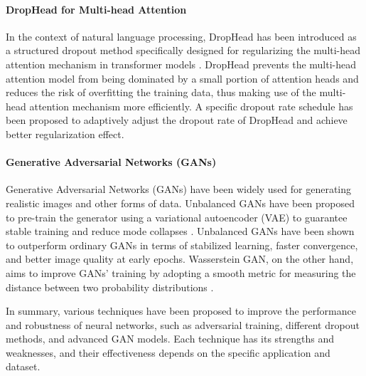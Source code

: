\paragraph{DropHead for Multi-head Attention}
In the context of natural language processing, DropHead has been introduced as a structured dropout method specifically designed for regularizing the multi-head attention mechanism in transformer models \cite{2004.13342}. DropHead prevents the multi-head attention model from being dominated by a small portion of attention heads and reduces the risk of overfitting the training data, thus making use of the multi-head attention mechanism more efficiently. A specific dropout rate schedule has been proposed to adaptively adjust the dropout rate of DropHead and achieve better regularization effect.

\paragraph{Generative Adversarial Networks (GANs)}
Generative Adversarial Networks (GANs) have been widely used for generating realistic images and other forms of data. Unbalanced GANs have been proposed to pre-train the generator using a variational autoencoder (VAE) to guarantee stable training and reduce mode collapses \cite{2002.02112}. Unbalanced GANs have been shown to outperform ordinary GANs in terms of stabilized learning, faster convergence, and better image quality at early epochs. Wasserstein GAN, on the other hand, aims to improve GANs' training by adopting a smooth metric for measuring the distance between two probability distributions \cite{1904.08994}.

In summary, various techniques have been proposed to improve the performance and robustness of neural networks, such as adversarial training, different dropout methods, and advanced GAN models. Each technique has its strengths and weaknesses, and their effectiveness depends on the specific application and dataset.